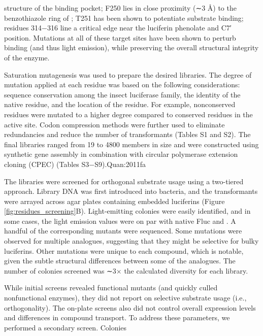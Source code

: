 structure of the binding pocket;\cite{BRANCHINI:2001gr} F250 lies in close proximity
(∼3 Å) to the benzothiazole ring of \dluciferin{}; T251 has been
shown to potentiate substrate binding;\cite{Branchini:2003kt} residues 314−316 line
a critical edge near the luciferin phenolate and C7′ position.
Mutations at all of these target sites have been shown to perturb \dluciferin{} binding (and thus light emission), while
preserving the overall structural integrity of the enzyme.\cite{Branchini:2007bw, Branchini:2003kt, Viviani:2013ej}
\par
Saturation mutagenesis was used to prepare the desired
libraries. The degree of mutation applied at each residue was
based on the following considerations: sequence conservation
among the insect luciferase family, the identity of the native
residue, and the location of the residue. For example,
nonconserved residues were mutated to a higher degree
compared to conserved residues in the active site. Codon
compression methods were further used to eliminate
redundancies and reduce the number of transformants (Tables
S1 and S2).\cite{Pines:2014he} The final libraries ranged from 19 to 4800
members in size and were constructed using synthetic gene
assembly\cite{Ness:2002cc} in combination with circular polymerase %
extension
cloning (CPEC) (Tables S3−S9).{Quan:2011fa}
\par
The libraries were screened for orthogonal substrate usage
using a two-tiered approach. Library DNA was first introduced
into bacteria, and the transformants were arrayed across agar
plates containing embedded luciferins (Figure \ref{fig:residues_screening}B). Light-emitting
colonies were easily identified, and in
some cases, the light emission values were on par with native
Fluc and \dluciferin{}. A handful of the
corresponding mutants were sequenced. Some mutations
were observed for multiple analogues, suggesting that they
might be selective for bulky luciferins. Other
mutations were unique to each compound, which is notable,
given the subtle structural differences between some of the
analogues. The number of colonies screened was ∼3× the
calculated diversity for each library.
\par
While initial screens revealed functional mutants (and
quickly culled nonfunctional enzymes), they did not report
on selective substrate usage (i.e., orthogonality). The on-plate
screens also did not control overall expression levels and
differences in compound transport. To address these
parameters, we performed a secondary screen. Colonies
